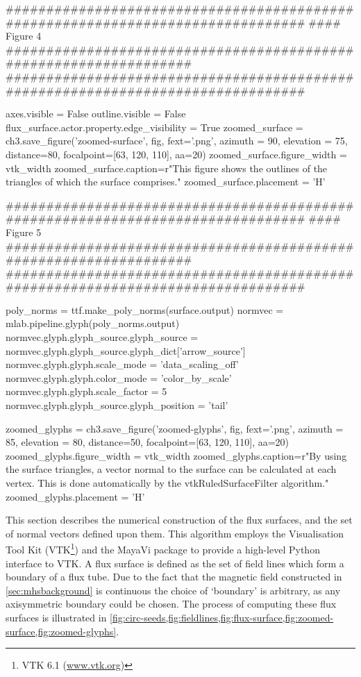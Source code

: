 \begin{pycode}[chapter3a]
################################################################################
#### Figure 4 ##################################################################
################################################################################

axes.visible = False
outline.visible = False
flux_surface.actor.property.edge_visibility = True
zoomed_surface = ch3.save_figure('zoomed-surface', fig, fext='.png', azimuth = 90, elevation = 75, distance=80, focalpoint=[63, 120, 110], aa=20)
zoomed_surface.figure_width = vtk_width
zoomed_surface.caption=r"This figure shows the outlines of the triangles of which the surface comprises."
zoomed_surface.placement = 'H'

################################################################################
#### Figure 5 ##################################################################
################################################################################

poly_norms = ttf.make_poly_norms(surface.output)
normvec = mlab.pipeline.glyph(poly_norms.output)
normvec.glyph.glyph_source.glyph_source = normvec.glyph.glyph_source.glyph_dict['arrow_source']
normvec.glyph.glyph.scale_mode = 'data_scaling_off'
normvec.glyph.glyph.color_mode = 'color_by_scale'
normvec.glyph.glyph.scale_factor = 5
normvec.glyph.glyph_source.glyph_position = 'tail'

zoomed_glyphs = ch3.save_figure('zoomed-glyphs', fig, fext='.png', azimuth = 85, elevation = 80, distance=50, focalpoint=[63, 120, 110], aa=20)
zoomed_glyphs.figure_width = vtk_width
zoomed_glyphs.caption=r"By using the surface triangles, a vector normal to the surface can be calculated at each vertex. This is done automatically by the vtkRuledSurfaceFilter algorithm."
zoomed_glyphs.placement = 'H'
\end{pycode}

This section describes the numerical construction of the flux surfaces, and the set of normal vectors defined upon them.
This algorithm employs the Visualisation Tool Kit (VTK\footnote{VTK 6.1 (\url{www.vtk.org})}) and the MayaVi package \citep{Ramachandran2011} to provide a high-level Python interface to VTK.
A flux surface is defined as the set of field lines which form a boundary of a flux tube.
Due to the fact that the magnetic field constructed in \cref{sec:mhsbackground} is continuous the choice of `boundary' is arbitrary, as any axisymmetric boundary could be chosen.
The process of computing these flux surfaces is illustrated in \cref{fig:circ-seeds,fig:fieldlines,fig:flux-surface,fig:zoomed-surface,fig:zoomed-glyphs}.

